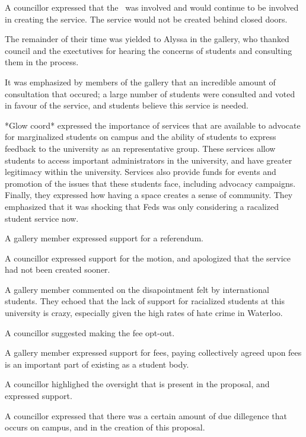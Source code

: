 \begin{motion}
    A councillor expressed that the \clac\ was involved and would continue to
    be involved in creating the service. The service would not be created 
    behind closed doors. 

    The remainder of their time was yielded to Alyssa in the gallery, who
    thanked council and the exectutives for hearing the concerns of students
    and consulting them in the process. 

    It was emphasized by members of the gallery that an incredible amount of
    consultation that occured; a large number of students were consulted and
    voted in favour of the service, and students believe this service is needed.

    *Glow coord* expressed the importance of services that are available to 
    advocate for marginalized students on campus and the ability of students
    to express feedback to the university as an representative group. These
    services allow students to access important administrators in the 
    university, and have greater legitimacy within the university. Services
    also provide funds for events and promotion of the issues that these 
    students face, including advocacy campaigns. Finally, they expressed how 
    having a space creates a sense of community. They emphasized that it was
    shocking that Feds was only considering a racalized student service now.

    A gallery member expressed support for a referendum.

    A councillor expressed support for the motion, and apologized that the
    service had not been created sooner. 

    A gallery member commented on the disapointment felt by international 
    students. They echoed that the lack of support for racialized students at
    this university is crazy, especially given the high rates of hate crime in
    Waterloo.

    A councillor suggested making the fee opt-out. 

    A gallery member expressed support for fees, paying collectively agreed
    upon fees is an important part of existing as a student body.

    A councillor highlighed the oversight that is present in the proposal, 
    and expressed support.

    A councillor expressed that there was a certain amount of due dillegence 
    that occurs on campus, and in the creation of this proposal. 


\end{motion}
